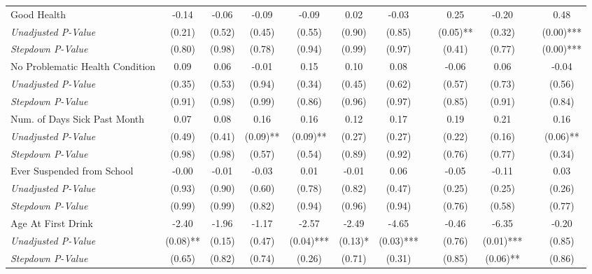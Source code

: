 \begin{tabular}{l c c c c c c c c c c c}
Good Health & -0.14 & -0.06 & -0.09 & -0.09 & 0.02 & -0.03 & & 0.25 & -0.20 & & 0.48 \\
\quad \textit{Unadjusted P-Value} & (0.21) & (0.52) & (0.45) & (0.55) & (0.90) & (0.85) & & (0.05)** & (0.32) & & (0.00)*** \\
\quad \textit{Stepdown P-Value} & (0.80) & (0.98) & (0.78) & (0.94) & (0.99) & (0.97) & & (0.41) & (0.77) & & (0.00)*** \\
No Problematic Health Condition & 0.09 & 0.06 & -0.01 & 0.15 & 0.10 & 0.08 & & -0.06 & 0.06 & & -0.04 \\
\quad \textit{Unadjusted P-Value} & (0.35) & (0.53) & (0.94) & (0.34) & (0.45) & (0.62) & & (0.57) & (0.73) & & (0.56) \\
\quad \textit{Stepdown P-Value} & (0.91) & (0.98) & (0.99) & (0.86) & (0.96) & (0.97) & & (0.85) & (0.91) & & (0.84) \\
Num. of Days Sick Past Month & 0.07 & 0.08 & 0.16 & 0.16 & 0.12 & 0.17 & & 0.19 & 0.21 & & 0.16 \\
\quad \textit{Unadjusted P-Value} & (0.49) & (0.41) & (0.09)** & (0.09)** & (0.27) & (0.27) & & (0.22) & (0.16) & & (0.06)** \\
\quad \textit{Stepdown P-Value} & (0.98) & (0.98) & (0.57) & (0.54) & (0.89) & (0.92) & & (0.76) & (0.77) & & (0.34) \\
Ever Suspended from School & -0.00 & -0.01 & -0.03 & 0.01 & -0.01 & 0.06 & & -0.05 & -0.11 & & 0.03 \\
\quad \textit{Unadjusted P-Value} & (0.93) & (0.90) & (0.60) & (0.78) & (0.82) & (0.47) & & (0.25) & (0.25) & & (0.26) \\
\quad \textit{Stepdown P-Value} & (0.99) & (0.99) & (0.82) & (0.94) & (0.96) & (0.94) & & (0.76) & (0.58) & & (0.77) \\
Age At First Drink & -2.40 & -1.96 & -1.17 & -2.57 & -2.49 & -4.65 & & -0.46 & -6.35 & & -0.20 \\
\quad \textit{Unadjusted P-Value} & (0.08)** & (0.15) & (0.47) & (0.04)*** & (0.13)* & (0.03)*** & & (0.76) & (0.01)*** & & (0.85) \\
\quad \textit{Stepdown P-Value} & (0.65) & (0.82) & (0.74) & (0.26) & (0.71) & (0.31) & & (0.85) & (0.06)** & & (0.86) \\
\bottomrule
\end{tabular}
